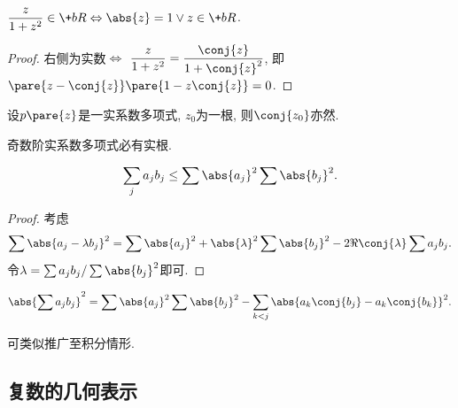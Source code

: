 \documentclass[../ComplexVariable.tex]{subfiles}
\begin{document}
\begin{sample}
    \begin{ex}
        $\displaystyle \frac{z}{1+z^2} \in\+bR \Leftrightarrow \abs{z} = 1 \lor z\in\+bR$.\hfill{}
    \end{ex}
    \begin{proof}
        右侧为实数$\Leftrightarrow$
        $\displaystyle\frac{z}{1+z^2} = \frac{\conj{z}}{1+\conj{z}^2}$, 即$\pare{z-\conj{z}}\pare{1-z\conj{z}} = 0$.
    \end{proof}
\end{sample}
\begin{sample}
    \begin{ex}
        设$p\pare{z}$是一实系数多项式, $z_0$为一根, 则$\conj{z_0}$亦然.
    \end{ex}
    \begin{corollary}
        奇数阶实系数多项式必有实根.
    \end{corollary}
\end{sample}
\begin{sample}
    \begin{ex}[Cauchy不等式]
        \[ \sum_j a_jb_j \le \sum\abs{a_j}^2\sum \abs{b_j}^2. \]
    \end{ex}
    \begin{proof}
        考虑  
        \[ \sum \abs{a_j - \lambda b_j}^2 = \sum \abs{a_j}^2 + \abs{\lambda}^2 \sum \abs{b_j}^2 - 2\Re\conj{\lambda}\sum a_jb_j. \]
        令$\lambda = \sum a_jb_j/\sum \abs{b_j}^2$即可.
    \end{proof}
    \begin{remark}[Lagrange恒等式]
        \[ \abs{\sum a_jb_j}^2 = \sum\abs{a_j}^2\sum\abs{b_j}^2 - \sum_{k<j}\abs{a_k\conj{b_j} - a_k\conj{b_k}}^2. \]
    \end{remark}
    \begin{remark}
        可类似推广至积分情形.
    \end{remark}
\end{sample}


\subsection{复数的几何表示} %
\label{sub:复数的几何表示}
\end{document}
